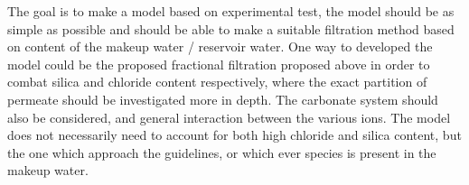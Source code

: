 The goal is to make a model based on experimental test, the model should be as simple as possible and should be able to make a suitable filtration method based on content of the makeup water / reservoir water. 
One way to developed the model could be the proposed fractional filtration proposed above in order to combat silica and chloride content respectively, where the exact partition of permeate should be investigated more in depth. 
The carbonate system should also be considered, and general interaction between the various ions. 
The model does not necessarily need to account for both high chloride and silica content, but the one which approach the guidelines, or which ever species is present in the makeup water. 



